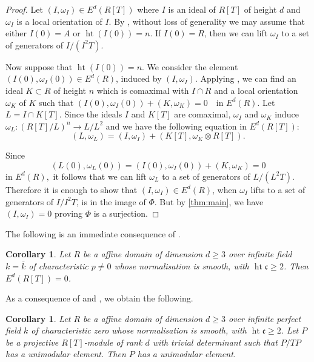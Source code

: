 \documentclass[11pt,reqno]{amsart}
\theoremstyle{plain}
\newtheorem{corollary}[theorem]{Corollary}
\theoremstyle{definition}
\newcommand{\hgt}{\operatorname{ht}}
\newcommand{\cc}{\mathfrak{c}}
\begin{document}
\begin{proof}
Let $(I,\omega_I)\in E^d(R[T])$ where $I$ is an ideal of $R[T]$ of height
$d$ and $\omega_I$ is a local orientation of $I$. By \cite[Lemma 2.9]{Das03}, without
loss of generality we may assume that either $I(0)=A$ or
$\operatorname{ht}(I(0))=n$. If $I(0)=R$, then we can lift $\omega_I$ to a set of generators of
$I/(I^2T)$. 

Now suppose that $\operatorname{ht}(I(0))=n$. We consider the element $(I(0),\omega_I(0))\in E^d(R)$,
induced by $(I,\omega_I)$. Applying \cite[Lemma 2.12]{Das03}, we can find an ideal $K\subset R$ of height $n$ which is comaximal with $I\cap R$ and a
local orientation $\omega_K$ of $K$ such that $(I(0),\omega_I(0))+(K,\omega_K)=0
\quad\text{in }E^d(R)$. Let $L=I\cap K[T]$. Since the ideals $I$ and $K[T]$ are comaximal,
$\omega_I$ and $\omega_K$ induce $\omega_L:(R[T]/L)^n\longrightarrow L/L^2
$ and we have the following equation in $E^d(R[T])$:
\[
(L,\omega_L)
=
(I,\omega_I)+(K[T],\omega_K\otimes R[T]).
\]

Since
\[
(L(0),\omega_L(0))
=
(I(0),\omega_I(0))+(K,\omega_K)
=0
\]
in $E^d(R),$ it follows that we can lift $\omega_L$ to a set of
generators of $L/(L^2T)$. 
Therefore it is enough to show that $(I,\omega_I)\in E^d(R)$, when $\omega_I$ lifts to a set of generators of $I/I^2T$, is in the image of $\Phi$. But by \ref{thm:main}, we have $(I,\omega_I)=0$ proving $\Phi$ is a surjection. 
\end{proof}
The following is an immediate consequence of \cite[Theorem 2.4]{Das18}.
\begin{corollary}\label{cor:finitefield}
Let $R$ be a affine domain of dimension $d\ge3$  over infinite field $k=\overline{k}$  of characteristic $p\neq 0$ whose
normalisation is smooth, with $\hgt\cc\ge 2$. Then $E^d(R[T])=0$.
\end{corollary}
As a consequence of \cite[Corollary 4.11]{Das18} and \cite[Corollary 4.4]{BS00}, we obtain the following.
\begin{corollary}\label{cor:unimod}
Let $R$ be a affine domain of dimension $d\ge3$  over infinite perfect field $k$  of characteristic zero whose
normalisation is smooth, with $\hgt\cc\ge 2$. Let $P$ be a projective $R[T]$-module of rank $d$
with trivial determinant such that $P/TP$ has a unimodular element. Then
$P$ has a unimodular element.
\end{corollary}
\end{document}
